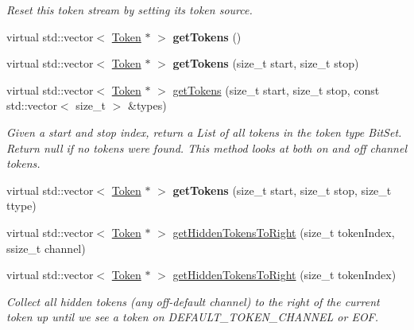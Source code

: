 \begin{DoxyCompactItemize}
\begin{DoxyCompactList}\small\item\em Reset this token stream by setting its token source. \end{DoxyCompactList}\item 
\mbox{\label{classantlr4_1_1BufferedTokenStream_af6bfd7d726c911f192bae1eb6aeb571c}} 
virtual std\+::vector$<$ \hyperlink{classantlr4_1_1Token}{Token} $\ast$ $>$ {\bfseries get\+Tokens} ()
\item 
\mbox{\label{classantlr4_1_1BufferedTokenStream_a1a2de27fefe90b711a500be49857c2da}} 
virtual std\+::vector$<$ \hyperlink{classantlr4_1_1Token}{Token} $\ast$ $>$ {\bfseries get\+Tokens} (size\+\_\+t start, size\+\_\+t stop)
\item 
virtual std\+::vector$<$ \hyperlink{classantlr4_1_1Token}{Token} $\ast$ $>$ \hyperlink{classantlr4_1_1BufferedTokenStream_a1da75f1766b2758b16be452bc1e06681}{get\+Tokens} (size\+\_\+t start, size\+\_\+t stop, const std\+::vector$<$ size\+\_\+t $>$ \&types)
\begin{DoxyCompactList}\small\item\em Given a start and stop index, return a List of all tokens in the token type Bit\+Set. Return null if no tokens were found. This method looks at both on and off channel tokens. \end{DoxyCompactList}\item 
\mbox{\label{classantlr4_1_1BufferedTokenStream_a18ddeab3509ccc606731b07a0c81725e}} 
virtual std\+::vector$<$ \hyperlink{classantlr4_1_1Token}{Token} $\ast$ $>$ {\bfseries get\+Tokens} (size\+\_\+t start, size\+\_\+t stop, size\+\_\+t ttype)
\item 
virtual std\+::vector$<$ \hyperlink{classantlr4_1_1Token}{Token} $\ast$ $>$ \hyperlink{classantlr4_1_1BufferedTokenStream_a6c260c6968178e322e5651ef0766925e}{get\+Hidden\+Tokens\+To\+Right} (size\+\_\+t token\+Index, ssize\+\_\+t channel)
\item 
virtual std\+::vector$<$ \hyperlink{classantlr4_1_1Token}{Token} $\ast$ $>$ \hyperlink{classantlr4_1_1BufferedTokenStream_a962f9c5cfb338e728948510a687174ec}{get\+Hidden\+Tokens\+To\+Right} (size\+\_\+t token\+Index)
\begin{DoxyCompactList}\small\item\em Collect all hidden tokens (any off-\/default channel) to the right of the current token up until we see a token on D\+E\+F\+A\+U\+L\+T\+\_\+\+T\+O\+K\+E\+N\+\_\+\+C\+H\+A\+N\+N\+EL or E\+OF. \end{DoxyCompactList}\item 

\end{DoxyCompactItemize}
